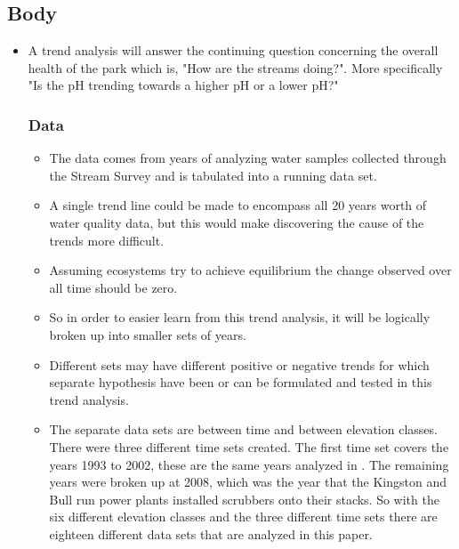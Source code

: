 \subsection{Body}
\begin{itemize}
    \item A trend analysis will answer the continuing question concerning the overall health of the park which is, "How are the streams doing?".  
    More specifically "Is the pH trending towards a higher pH or a lower pH?"
    \subsubsection{Data}
    \begin{itemize}
        \item The data comes from years of analyzing water samples collected through the Stream Survey and is tabulated into a running data set.
        \item A single trend line could be made to encompass all 20 years worth of water quality data, but this would make discovering the cause of the trends
        more difficult.
        \item Assuming ecosystems try to achieve equilibrium the change observed over all time should be zero.
        \item So in order to easier learn from this trend analysis, it will be logically broken up into smaller sets of years.
        \item Different sets may have different positive or negative trends for which separate hypothesis have been or can be formulated and tested in this trend
        analysis.
        \item The separate data sets are between time and between elevation classes.  There were three different time sets created.  The first time set covers the years 1993 to 2002, these are the same years analyzed in \citep{robinson2008ph}.  The remaining years were broken up at 2008, which was the year that the Kingston and Bull run power plants installed scrubbers onto their stacks.  So with the six different elevation classes and the three different time sets there are eighteen different data sets that are analyzed in this paper. 

\end{itemize}
    \end{itemize}
